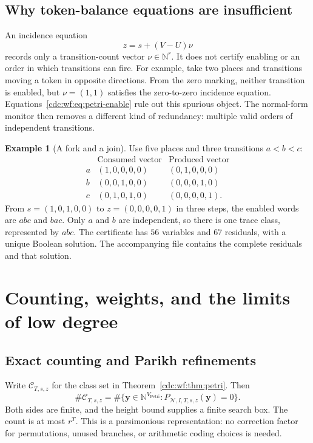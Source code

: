 \documentclass[11pt,a4paper]{article}
\theoremstyle{definition}
\newtheorem{example}[example]{Example}
\theoremstyle{remark}
\newcommand{\N}{\mathbb N}
\newcommand{\srctag}[1]{\texorpdfstring{\hspace{0.5em}{\normalfont\small\color{accent}[#1]}}{ [#1]}}
\begin{document}
\subsection{Why token-balance equations are insufficient}
An incidence equation
\[
 z=s+(V-U)\nu
\]
records only a transition-count vector $\nu\in\N^r$. It does not certify enabling or an order in which transitions can fire. For example, take two places and transitions moving a token in opposite directions. From the zero marking, neither transition is enabled, but $\nu=(1,1)$ satisfies the zero-to-zero incidence equation. Equations~\eqref{cdc:wf:eq:petri-enable} rule out this spurious object. The normal-form monitor then removes a different kind of redundancy: multiple valid orders of independent transitions.

\begin{example}[A fork and a join]\label{cdc:wf:ex:fork}
Use five places and three transitions $a<b<c$:
\[
\begin{array}{c|cc}
 &\text{Consumed vector}&\text{Produced vector}\\\hline
 a&(1,0,0,0,0)&(0,1,0,0,0)\\
 b&(0,0,1,0,0)&(0,0,0,1,0)\\
 c&(0,1,0,1,0)&(0,0,0,0,1).
\end{array}
\]
From $s=(1,0,1,0,0)$ to $z=(0,0,0,0,1)$ in three steps, the enabled words are $abc$ and $bac$. Only $a$ and $b$ are independent, so there is one trace class, represented by $abc$. The certificate has $56$ variables and $67$ residuals, with a unique Boolean solution. The accompanying file  contains the complete residuals and that solution.
\end{example}

\section{Counting, weights, and the limits of low degree\srctag{04}}
\subsection{Exact counting and Parikh refinements}
Write $\mathcal C_{T,s,z}$ for the class set in Theorem~\ref{cdc:wf:thm:petri}. Then
\begin{equation}\label{cdc:wf:eq:count}
 \#\mathcal C_{T,s,z}
 =\#\{\mathbf y\in\N^{V_{\mathrm{Petri}}}:
       P_{\mathcal N,I,T,s,z}(\mathbf y)=0\}.
\end{equation}
Both sides are finite, and the height bound supplies a finite search box. The count is at most $r^T$. This is a parsimonious representation: no correction factor for permutations, unused branches, or arithmetic coding choices is needed.
\end{document}
